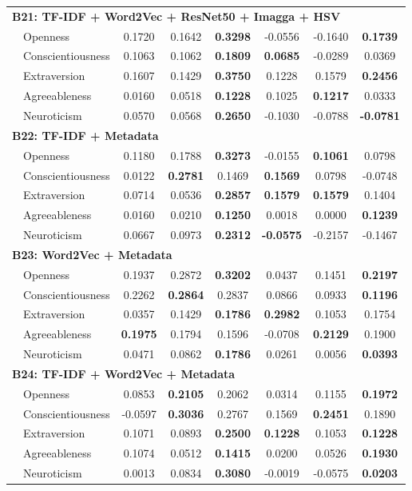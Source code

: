 \begin{longtable}{llcccccc}
\hline
\multicolumn{8}{l}{\textbf{B21: TF-IDF + Word2Vec + ResNet50 + Imagga + HSV}} \\
& Openness & 0.1720 & 0.1642 & \textbf{0.3298} & -0.0556 & -0.1640 & \textbf{0.1739} \\
& Conscientiousness & 0.1063 & 0.1062 & \textbf{0.1809} & \textbf{0.0685} & -0.0289 & 0.0369 \\
& Extraversion & 0.1607 & 0.1429 & \textbf{0.3750} & 0.1228 & 0.1579 & \textbf{0.2456} \\
& Agreeableness & 0.0160 & 0.0518 & \textbf{0.1228} & 0.1025 & \textbf{0.1217} & 0.0333 \\
& Neuroticism & 0.0570 & 0.0568 & \textbf{0.2650} & -0.1030 & -0.0788 & \textbf{-0.0781} \\

\hline
\multicolumn{8}{l}{\textbf{B22: TF-IDF + Metadata}} \\
& Openness & 0.1180 & 0.1788 & \textbf{0.3273} & -0.0155 & \textbf{0.1061} & 0.0798 \\
& Conscientiousness & 0.0122 & \textbf{0.2781} & 0.1469 & \textbf{0.1569} & 0.0798 & -0.0748 \\
& Extraversion & 0.0714 & 0.0536 & \textbf{0.2857} & \textbf{0.1579} & \textbf{0.1579} & 0.1404 \\
& Agreeableness & 0.0160 & 0.0210 & \textbf{0.1250} & 0.0018 & 0.0000 & \textbf{0.1239} \\
& Neuroticism & 0.0667 & 0.0973 & \textbf{0.2312} & \textbf{-0.0575} & -0.2157 & -0.1467 \\

\hline
\multicolumn{8}{l}{\textbf{B23: Word2Vec + Metadata}} \\
& Openness & 0.1937 & 0.2872 & \textbf{0.3202} & 0.0437 & 0.1451 & \textbf{0.2197} \\
& Conscientiousness & 0.2262 & \textbf{0.2864} & 0.2837 & 0.0866 & 0.0933 & \textbf{0.1196} \\
& Extraversion & 0.0357 & 0.1429 & \textbf{0.1786} & \textbf{0.2982} & 0.1053 & 0.1754 \\
& Agreeableness & \textbf{0.1975} & 0.1794 & 0.1596 & -0.0708 & \textbf{0.2129} & 0.1900 \\
& Neuroticism & 0.0471 & 0.0862 & \textbf{0.1786} & 0.0261 & 0.0056 & \textbf{0.0393} \\

\hline
\multicolumn{8}{l}{\textbf{B24: TF-IDF + Word2Vec + Metadata}} \\
& Openness & 0.0853 & \textbf{0.2105} & 0.2062 & 0.0314 & 0.1155 & \textbf{0.1972} \\
& Conscientiousness & -0.0597 & \textbf{0.3036} & 0.2767 & 0.1569 & \textbf{0.2451} & 0.1890 \\
& Extraversion & 0.1071 & 0.0893 & \textbf{0.2500} & \textbf{0.1228} & 0.1053 & \textbf{0.1228} \\
& Agreeableness & 0.1074 & 0.0512 & \textbf{0.1415} & 0.0200 & 0.0526 & \textbf{0.1930} \\
& Neuroticism & 0.0013 & 0.0834 & \textbf{0.3080} & -0.0019 & -0.0575 & \textbf{0.0203} \\


\end{longtable}
